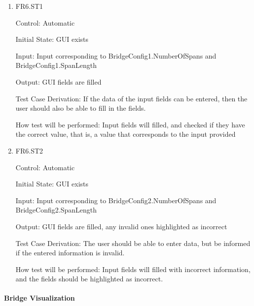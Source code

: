 \documentclass[12pt, titlepage]{article}
\begin{document}
\begin{enumerate}

  \item{FR6.ST1\\}

  Control: Automatic
  
  Initial State: GUI exists
  
  Input: Input corresponding to BridgeConfig1.NumberOfSpans and BridgeConfig1.SpanLength
  
  Output: GUI fields are filled
  
  Test Case Derivation: If the data of the input fields can be entered, then the user
  should also be able to fill in the fields.
  
  How test will be performed: Input fields will filled, and checked if they have the
  correct value, that is, a value that corresponds to the input provided
  
  \item{FR6.ST2\\}
  
  Control: Automatic
  
  Initial State: GUI exists
  
  Input: Input corresponding to BridgeConfig2.NumberOfSpans and BridgeConfig2.SpanLength
  
  Output: GUI fields are filled, any invalid ones highlighted as incorrect
  
  Test Case Derivation: The user should be able to enter data, but be informed if the
  entered information is invalid.
  
  How test will be performed: Input fields will filled with incorrect information, 
  and the fields should be highlighted as incorrect.

\end{enumerate}

\paragraph{Bridge Visualization}
\end{document}
